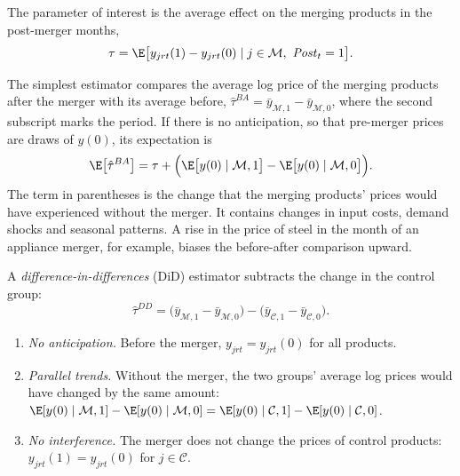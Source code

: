 \begin{definition}\label{def:11-att}
The parameter of interest is the average effect on the merging products in the post-merger months,
\begin{equation}\label{eq:11-att}
\tau=\E\big[y_{jrt}(1)-y_{jrt}(0)\mid j\in\mathcal{M},\ \mathit{Post}_t=1\big].
\end{equation}
\end{definition}

The simplest estimator compares the average log price of the merging products after the merger with its average
before, $\hat\tau^{BA}=\bar y_{\mathcal{M},1}-\bar y_{\mathcal{M},0}$, where the second subscript marks the
period. If there is no anticipation, so that pre-merger prices are draws of $y(0)$, its expectation is
\begin{equation*}
\E\big[\hat\tau^{BA}\big]=\tau+\Big(\E\big[y(0)\mid\mathcal{M},1\big]-\E\big[y(0)\mid\mathcal{M},0\big]\Big).
\end{equation*}
The term in parentheses is the change that the merging products' prices would have experienced without the
merger. It contains changes in input costs, demand shocks and seasonal patterns. A rise in the price of steel
in the month of an appliance merger, for example, biases the before-after comparison upward.

A \emph{difference-in-differences} (DiD) estimator subtracts the change in the control group:
\begin{equation}\label{eq:11-did}
\hat\tau^{DD}=\big(\bar y_{\mathcal{M},1}-\bar y_{\mathcal{M},0}\big)-\big(\bar y_{\mathcal{C},1}-\bar y_{\mathcal{C},0}\big).
\end{equation}

\begin{assumption}\label{ass:11-did}
\leavevmode
\begin{enumerate}[label=(\roman*)]
\item \emph{No anticipation.} Before the merger, $y_{jrt}=y_{jrt}(0)$ for all products.
\item \emph{Parallel trends.} Without the merger, the two groups' average log prices would have changed by the
same amount: $\E[y(0)\mid\mathcal{M},1]-\E[y(0)\mid\mathcal{M},0]=\E[y(0)\mid\mathcal{C},1]-\E[y(0)\mid\mathcal{C},0]$.
\item \emph{No interference.} The merger does not change the prices of control products: $y_{jrt}(1)=y_{jrt}(0)$
for $j\in\mathcal{C}$.
\end{enumerate}
\end{assumption}

